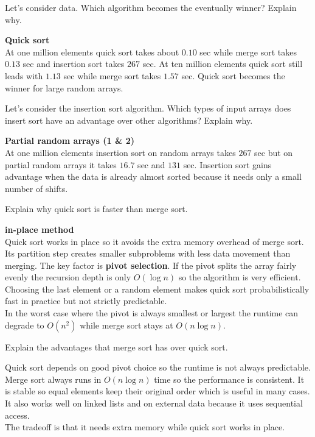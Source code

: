 \begin{question_with_subs}{}
\begin{subq}{Let’s consider  data. Which algorithm becomes the eventually winner? Explain why.}
\begin{answer}
\textbf{Quick sort}\\
At one million elements quick sort takes about $0.10$ sec while merge sort takes $0.13$ sec and insertion sort takes $267$ sec. At ten million elements quick sort still leads with $1.13$ sec while merge sort takes $1.57$ sec. Quick sort becomes the winner for large random arrays.
\end{answer}
\end{subq}

\begin{subq}{Let’s consider the insertion sort algorithm. Which types of input arrays does insert sort have an advantage over other algorithms? Explain why.}
\begin{answer}
\textbf{Partial random arrays (1 \& 2)}\\
At one million elements insertion sort on random arrays takes $267$ sec but on partial random arrays it takes $16.7$ sec and $131$ sec. Insertion sort gains advantage when the data is already almost sorted because it needs only a small number of shifts.
\end{answer}
\end{subq}

\begin{subq}{Explain why quick sort is faster than merge sort.}
\begin{answer}
\textbf{in-place method}\\
Quick sort works in place so it avoids the extra memory overhead of merge sort. Its partition step creates smaller subproblems with less data movement than merging. The key factor is \textbf{pivot selection}. If the pivot splits the array fairly evenly the recursion depth is only $O(\log n)$ so the algorithm is very efficient. Choosing the last element or a random element makes quick sort probabilistically fast in practice but not strictly predictable.\\In the worst case where the pivot is always smallest or largest the runtime can degrade to $O(n^2)$ while merge sort stays at $O(n \log n)$.
\end{answer}
\end{subq}

\begin{subq}{Explain the advantages that merge sort has over quick sort.}
\begin{answer}
Quick sort depends on good pivot choice so the runtime is not always predictable. Merge sort always runs in $O(n \log n)$ time so the performance is consistent. It is stable so equal elements keep their original order which is useful in many cases. It also works well on linked lists and on external data because it uses sequential access.\\The tradeoff is that it needs extra memory while quick sort works in place.
\end{answer}
\end{subq}
\end{question_with_subs}


